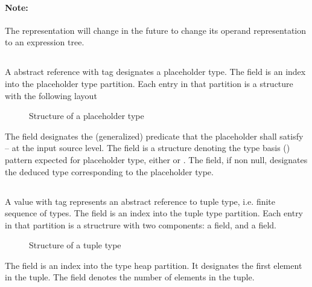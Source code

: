 
\paragraph{Note:} The  representation will change in the future to change its operand representation to an expression tree.

\subsection{}
\label{sec:ifc:TypeSort:Placeholder}

A  abstract reference with tag 
 designates a placeholder type.
The  field is an index into the placeholder type partition.
Each entry in that partition is a structure with the following layout
%
\begin{figure}[H]
	\centering
	\caption{Structure of a placeholder type}
	\label{fig:ifc-placeholder-type-structure}
\end{figure}
%
The  field designates the (generalized) predicate that the placeholder
shall satisfy -- at the input source level.
The  field is a structure denoting the type basis
() pattern expected for placeholder type,
either  or .
The  field, if non null, designates the deduced type corresponding to the placeholder type.


\subsection{}
\label{sec:ifc:TypeSort:Tuple}

A  value with tag  represents
an abstract reference to tuple type, i.e. finite sequence of types.
The  field is an index into the tuple type partition.
Each entry in that partition is a structrure with two components: a  field,
and a  field.
%
\begin{figure}[H]
	\centering
	\caption{Structure of a tuple type}
	\label{fig:ifc-tuple-type-structure}
\end{figure}
%
The  field is an index into the type heap partition.  It designates the first element
in the tuple.
The  field denotes the number of elements in the tuple.

